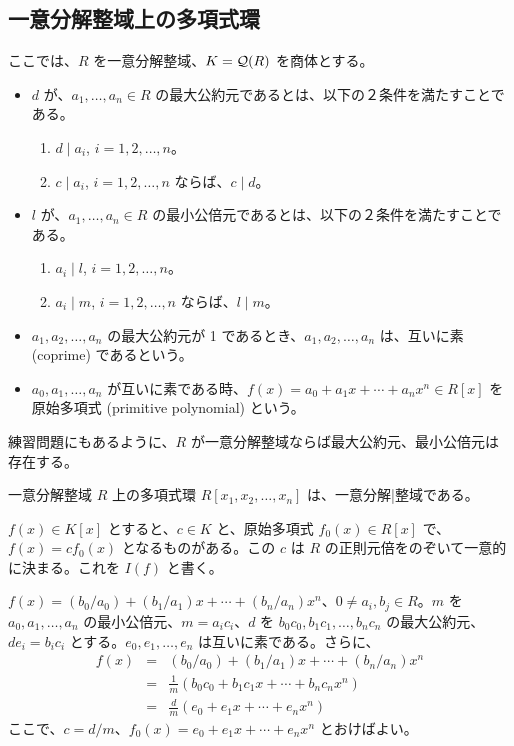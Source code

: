 \subsection{一意分解整域上の多項式環}
ここでは、$R$ を一意分解整域、$K = {\cal Q}(R)$ を商体とする。

\begin{itemize}
\item $d$ が、$a_1, \ldots, a_n\in R$ の最大公約元であるとは、以下の２条件を満たすことである。
	\begin{enumerate}
	\item $d\mid a_i$, $i = 1, 2,\ldots, n$。
	\item $c\mid a_i$, $i = 1, 2, \ldots, n$ ならば、$c\mid d$。
	\end{enumerate}
\item $l$ が、$a_1, \ldots, a_n\in R$ の最小公倍元であるとは、以下の２条件を満たすことである。
	\begin{enumerate}
	\item $a_i\mid l$, $i = 1, 2,\ldots, n$。
	\item $a_i\mid m$, $i = 1, 2, \ldots, n$ ならば、$l\mid m$。
	\end{enumerate}
\item $a_1, a_2, \ldots, a_n$ の最大公約元が 1 であるとき、$a_1, a_2, \ldots, a_n$ は、互いに素 (coprime) であるという。
\item $a_0, a_1, \ldots, a_n$ が互いに素である時、$f(x) = a_0 + a_1x + \cdots + a_nx^n\in R[x]$ を原始多項式 (primitive polynomial) という。
\end{itemize}

練習問題にもあるように、$R$ が一意分解整域ならば最大公約元、最小公倍元は存在する。

\begin{thm} \label{thm:poly_ufd}
一意分解整域 $R$ 上の多項式環 $R[x_1,x_2,\ldots,x_n]$ は、一意分解|整域である。
\end{thm}

\begin{lemma} \label{lemma:inhalt}
$f(x)\in K[x]$ とすると、$c\in K$ と、原始多項式 $f_0(x)\in R[x]$ で、$f(x) = cf_0(x)$ となるものがある。この $c$ は $R$ の正則元倍をのぞいて一意的に決まる。これを $I(f)$ と書く。
\end{lemma}
\proof
$f(x) = (b_0/a_0) + (b_1/a_1)x + \cdots + (b_n/a_n)x^n$、$0\neq a_i, b_j\in R$。$m$ を $a_0, a_1, \ldots, a_n$ の最小公倍元、$m = a_ic_i$、$d$ を $b_0c_0, b_1c_1, \ldots, b_nc_n$ の最大公約元、$de_i = b_ic_i$ とする。$e_0, e_1, \ldots, e_n$ は互いに素である。さらに、
\begin{eqnarray*}
f(x) & = & (b_0/a_0) + (b_1/a_1)x + \cdots + (b_n/a_n)x^n\\
	& = & \frac1m(b_0c_0 + b_1c_1x + \cdots + b_nc_nx^n)\\
	& = & \frac dm(e_0 + e_1x + \cdots + e_nx^n)
\end{eqnarray*}
ここで、$c = d/m$、$f_0(x) = e_0 + e_1x + \cdots + e_nx^n$ とおけばよい。

